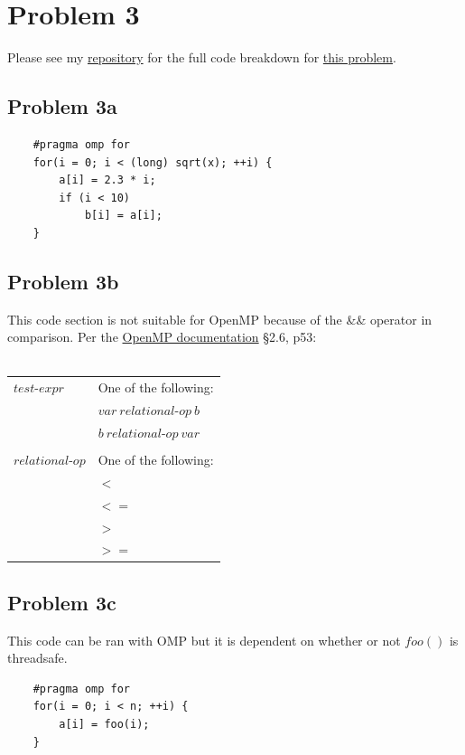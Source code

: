 \documentclass{article}
\begin{document}
\newpage
\section{Problem 3}
Please see my \href{https://github.com/macattackftw/HighPerfComputing}{repository} for the full code breakdown for \href{https://github.com/macattackftw/HighPerfComputing/blob/master/HW1/problem3.cpp}{this problem}.
\subsection{Problem 3a}
\begin{verbatim}
    #pragma omp for
    for(i = 0; i < (long) sqrt(x); ++i) {
        a[i] = 2.3 * i;
        if (i < 10) 
            b[i] = a[i];
    }
\end{verbatim}

\subsection{Problem 3b}
This code section is not suitable for OpenMP because of the \&\& operator in comparison.
Per the \hyperlink{https://www.openmp.org/wp-content/uploads/openmp-4.5.pdf}{OpenMP documentation} \S2.6, p53:\\\\
\begin{tabular}{@{}ll}
$test$-$expr$ & One of the following:\\
& $var\ relational$-$op\ b$\\
& $b\ relational$-$op\ var$\\\\

$relational$-$op$ & One of the following:\\
& $<$  \\
& $<=$ \\
& $>$  \\
& $>=$ \\
\end{tabular}

\subsection{Problem 3c}
This code can be ran with OMP but it is dependent on whether or not $foo()$ is threadsafe.
\begin{verbatim}
    #pragma omp for
    for(i = 0; i < n; ++i) {
        a[i] = foo(i);
    }
\end{verbatim}
\end{document}
